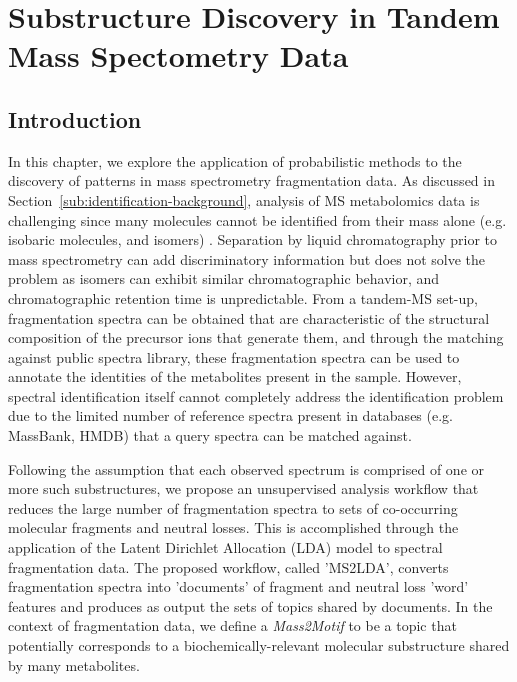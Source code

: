 \chapter{Substructure Discovery in Tandem Mass Spectometry Data}
\label{c:background}

\section{Introduction}

In this chapter, we explore the application of probabilistic methods to the discovery of patterns in mass spectrometry fragmentation data. As discussed in Section~\ref{sub:identification-background}, analysis of MS metabolomics data is challenging since many molecules cannot be identified from their mass alone (e.g. isobaric molecules, and isomers) \cite{VanderHooft2013, Kind2006}. Separation by liquid chromatography prior to mass spectrometry can add discriminatory information but does not solve the problem as isomers can exhibit similar chromatographic behavior, and chromatographic retention time is unpredictable. From a tandem-MS set-up, fragmentation spectra can be obtained that are characteristic of the structural composition of the precursor ions that generate them, and through the matching against public spectra library, these fragmentation spectra can be used to annotate the identities of the metabolites present in the sample. However, spectral identification itself cannot completely address the identification problem due to the limited number of reference spectra present in databases (e.g. MassBank, HMDB) that a query spectra can be matched against. 

Following the assumption that each observed spectrum is comprised of one or more such substructures, we propose an unsupervised analysis workflow that reduces the large number of fragmentation spectra to sets of co-occurring molecular fragments and neutral losses. This is accomplished through the application of the Latent Dirichlet Allocation (LDA) model to spectral fragmentation data. The proposed workflow, called 'MS2LDA', converts fragmentation spectra into 'documents' of fragment and neutral loss 'word' features and produces as output the sets of topics shared by documents. In the context of fragmentation data, we define a \textit{Mass2Motif} to be a topic that potentially corresponds to a biochemically-relevant molecular substructure shared by many metabolites. 

